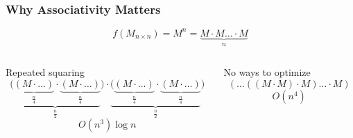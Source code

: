 \documentclass[xcolor=table,aspectratio=169]{beamer}
\begin{document}
\begin{frame}[fragile]
  \frametitle{Why Associativity Matters}
  \begin{center}
    $$
    f(M_{n\times n})= M^n = \underbrace{M\cdot M \ldots \cdot M}_{n}
    $$
  \end{center}      
  \begin{columns}[t]
    \begin{column}{0.5\textwidth}
      \begin{center}
        Repeated squaring
        $$
        \underbrace{(\underbrace{(M\cdot\ldots)}_{\frac{n}{4}}\cdot\underbrace{(M\cdot\ldots)}_{\frac{n}{4}}}_{\frac{n}{2}})\cdot\underbrace{(\underbrace{(M\cdot\ldots)}_{\frac{n}{4}}\cdot\underbrace{(M\cdot\ldots)}_{\frac{n}{4}}}_{\frac{n}{2}})
        $$
        $$
        O(n^3)\log{n}
        $$
      \end{center}
    \end{column}
    \begin{column}{0.5\textwidth}
      \begin{center}
        No ways to optimize
        $$
        (\ldots((M \cdot M) \cdot M)\ldots \cdot M)
        $$
        $$
        O(n^4)
        $$
      \end{center}
    \end{column}
  \end{columns}
\end{frame}
\end{document}
